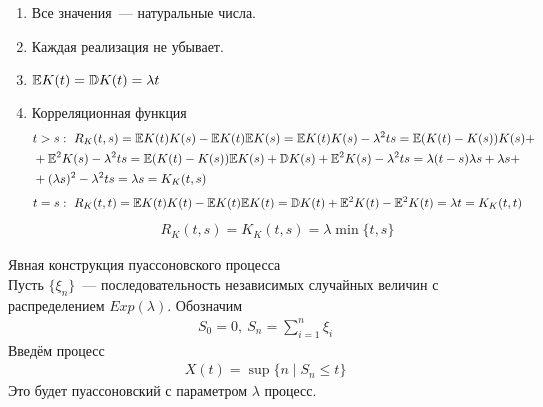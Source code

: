 \begin{enumerate}
    \item Все значения~--- натуральные числа.
    \item Каждая реализация не убывает.
    \item $\mathbb{E} K(t) = \mathbb{D} K(t) = \lambda t$
    \item Корреляционная функция
    \begin{align*}
      & t > s: \ R_K(t,s) = \mathbb{E} K(t)K(s) - \mathbb{E} K(t) \mathbb{E} K(s) = \mathbb{E} K(t)K(s) - \lambda^2 ts = \mathbb{E}(K(t) - K(s))K(s) + \\
      & + \mathbb{E}^2K(s) - \lambda^2 ts = \mathbb{E}(K(t)-K(s))\mathbb{E} K(s) + \mathbb{D} K(s) + \mathbb{E}^2K(s) - \lambda^2 ts = \lambda(t-s)\lambda s+ \lambda s + \\
      & + (\lambda s)^2 - \lambda^2 ts = \lambda s = K_K(t,s)
    \end{align*}
    \begin{align*}
      & t = s: \ R_K(t,t) = \mathbb{E} K(t)K(t) - \mathbb{E} K(t) \mathbb{E} K(t) = \mathbb{D} K(t) + \mathbb{E}^2 K(t) - \mathbb{E}^2 K(t) = \lambda t = K_K(t,t)
    \end{align*}
    \begin{align*}
      & R_K(t,s) = K_K(t,s) = \lambda \min\{t,s\}
    \end{align*}  
\end{enumerate}
\begin{theorem} Явная конструкция пуассоновского процесса
    \\
    Пусть $\{\xi_n\}$~--- последовательность независимых случайных величин с
    распределением $Exp(\lambda)$. Обозначим
    \begin{align*}
      & S_0 = 0, \ S_n = \sum_{i=1}^n \xi_i
    \end{align*}
    Введём процесс
    \begin{align*}
      & X(t) = \sup \{n \mid S_n \leq t\}
    \end{align*}
    Это будет пуассоновский с параметром $\lambda$ процесс.
\end{theorem}
